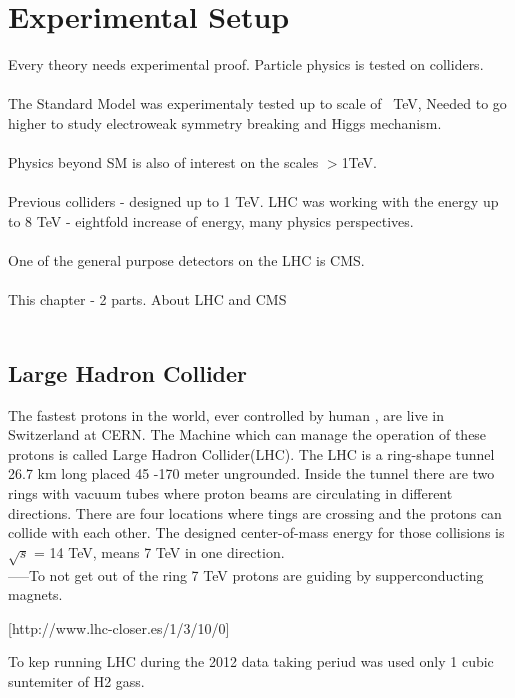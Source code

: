 \chapter{Experimental Setup}
Every theory needs experimental proof. Particle physics is tested on colliders.
\\
\\
The Standard Model was experimentaly tested up to scale of ~TeV, Needed to go higher to 
study electroweak symmetry breaking and Higgs mechanism.
\\
\\
Physics beyond SM is also of interest on the scales $>$1TeV.
\\
\\
Previous colliders - designed up to 1 TeV. LHC \cite{LHCmachine} was working with the energy
up to 8 TeV - eightfold increase of energy, many physics perspectives.
\\
\\
One of the general purpose detectors on the LHC is CMS.
\\
\\
This chapter - 2 parts. About LHC and CMS
\\
\\

\section{Large Hadron Collider}

The fastest protons in the world, ever controlled by human , are live in Switzerland at CERN.
The Machine which can manage the operation of these protons is called Large Hadron Collider(LHC). 
The LHC is a ring-shape tunnel 26.7 km long  placed 45 -170 meter ungrounded. 
Inside the tunnel there are two rings with vacuum tubes where proton beams are circulating in different directions.
There are four locations where tings are crossing and the protons can collide with each other. 
The designed center-of-mass energy for those collisions is $\sqrt{s}$ = 14 TeV, means 7 TeV in one direction.\\
-----To not get out of the ring 7 TeV protons are guiding by supperconducting magnets. 



[http://www.lhc-closer.es/1/3/10/0]

To kep running LHC during the 2012 data taking periud was used only 1 cubic suntemiter of H2 gass.

